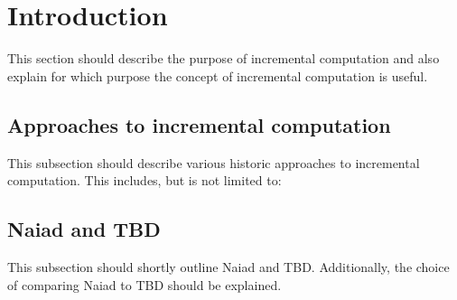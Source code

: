 \section{Introduction}
This section should describe the purpose of incremental computation and also explain for which purpose the concept of incremental computation is useful. 

\subsection{Approaches to incremental computation}
This subsection should describe various historic approaches to incremental computation. This includes, but is not limited to: 

\subsection{Naiad and TBD}
This subsection should shortly outline Naiad and TBD. Additionally, the choice of comparing Naiad to TBD should be explained. 

